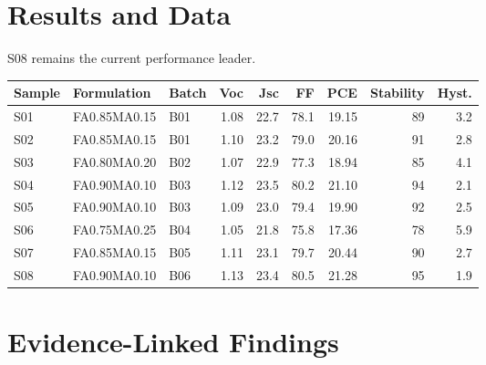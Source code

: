 \documentclass[10pt,a4paper]{article}
\begin{document}
\section{Results and Data}

S08 remains the current performance leader.
\begin{center}\end{center}
\scriptsize\begin{longtable}{@{}lllrrrrrr@{}}\toprule Sample & Formulation & Batch & Voc & Jsc & FF & PCE & Stability & Hyst. \\ \midrule\endhead
S01 & FA0.85MA0.15 & B01 & 1.08 & 22.7 & 78.1 & 19.15 & 89 & 3.2 \\
S02 & FA0.85MA0.15 & B01 & 1.10 & 23.2 & 79.0 & 20.16 & 91 & 2.8 \\
S03 & FA0.80MA0.20 & B02 & 1.07 & 22.9 & 77.3 & 18.94 & 85 & 4.1 \\
S04 & FA0.90MA0.10 & B03 & 1.12 & 23.5 & 80.2 & 21.10 & 94 & 2.1 \\
S05 & FA0.90MA0.10 & B03 & 1.09 & 23.0 & 79.4 & 19.90 & 92 & 2.5 \\
S06 & FA0.75MA0.25 & B04 & 1.05 & 21.8 & 75.8 & 17.36 & 78 & 5.9 \\
S07 & FA0.85MA0.15 & B05 & 1.11 & 23.1 & 79.7 & 20.44 & 90 & 2.7 \\
S08 & FA0.90MA0.10 & B06 & 1.13 & 23.4 & 80.5 & 21.28 & 95 & 1.9 \\
\bottomrule\end{longtable}\normalsize

\section{Evidence-Linked Findings}
\end{document}
